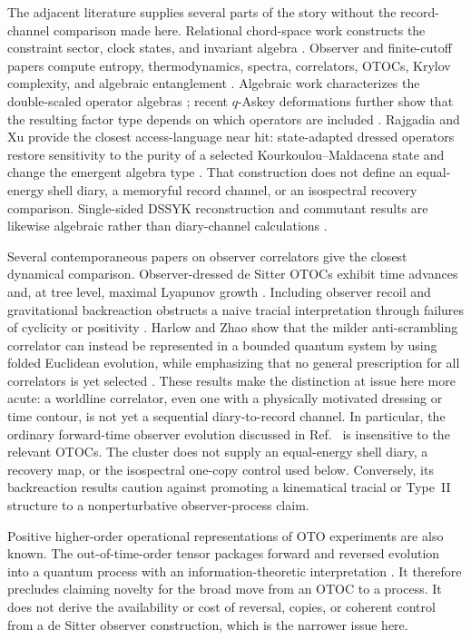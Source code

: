 \documentclass[11pt]{article}
\begin{document}
The adjacent literature supplies several parts of the story without the
record-channel comparison made here.  Relational chord-space work constructs
the constraint sector, clock states, and invariant algebra
\citep{AguilarRelational2025}.  Observer and finite-cutoff papers compute
entropy, thermodynamics, spectra, correlators, OTOCs, Krylov complexity, and
algebraic entanglement
\citep{TiettoVerlinde2025,NarovlanskyDynamics2025,AguilarT2,
AguilarFiniteCutoff}.  Algebraic work characterizes the double-scaled
operator algebras \citep{XuAlgebras}; recent $q$-Askey deformations further
show that the resulting factor type depends on which operators are included
\citep{AguilarQAskey}.  Rajgadia and Xu provide the closest
access-language near hit: state-adapted dressed operators restore sensitivity
to the purity of a selected Kourkoulou--Maldacena state and change the
emergent algebra type \citep{RajgadiaXu}.  That construction does not define
an equal-energy shell diary, a memoryful record channel, or an isospectral
recovery comparison.  Single-sided DSSYK reconstruction and commutant results
are likewise algebraic rather than diary-channel calculations
\citep{CaoGao}.

Several contemporaneous papers on observer correlators give the closest
dynamical comparison.  Observer-dressed de Sitter OTOCs exhibit time advances
and, at tree level, maximal Lyapunov growth
\citep{MilekhinNarovlanskyXu2026}.  Including observer recoil
and gravitational backreaction obstructs a naive tracial interpretation
through failures of cyclicity or positivity
\citep{ChenStanfordTangYang2026,CuiKolchmeyer2026}.  Harlow and Zhao show that
the milder anti-scrambling correlator can instead be represented in a bounded
quantum system by using folded Euclidean evolution, while emphasizing that no
general prescription for all correlators is yet selected
\citep{HarlowZhao2026}.  These results make the distinction at issue here more
acute: a worldline correlator, even one with a physically motivated dressing
or time contour, is not yet a sequential diary-to-record channel.  In
particular, the ordinary forward-time observer evolution discussed in
Ref.~\citep{CuiKolchmeyer2026} is insensitive to the relevant OTOCs.  The
cluster does not supply an equal-energy shell diary, a recovery map, or the
isospectral one-copy control used below.  Conversely, its backreaction
results caution against promoting a kinematical tracial or Type~II structure
to a nonperturbative observer-process claim.

Positive higher-order operational representations of OTO experiments are
also known.  The out-of-time-order tensor packages forward and reversed
evolution into a quantum process with an information-theoretic interpretation
\citep{ZonniosEtAl2021}.  It therefore precludes claiming novelty for the
broad move from an OTOC to a process.  It does not derive the availability or
cost of reversal, copies, or coherent control from a de Sitter observer
construction, which is the narrower issue here.
\end{document}
